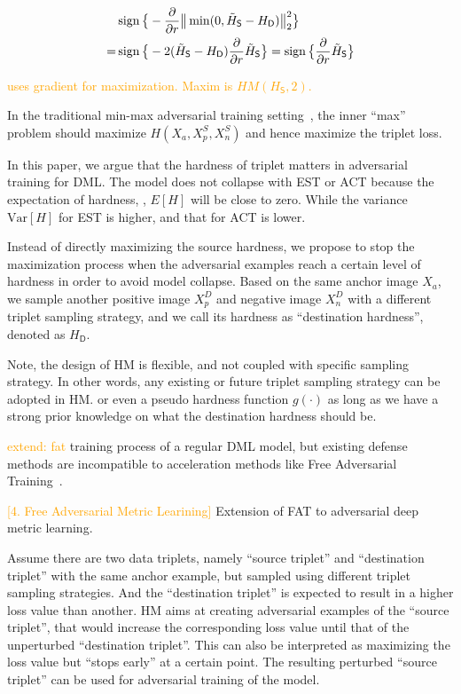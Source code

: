 \documentclass[10pt,twocolumn,letterpaper]{article}
\newcommand{\oo}[1]{\textcolor{orange}{#1}}
\begin{document}
\begin{align}
	&
	\operatorname{sign}\big\{
		-\frac{\partial}{\partial r} \big\| \min(0, 
		\tilde{H}_\mathsf{S} - H_\mathsf{D}) \big\|_2^2
	\big\}
	\\
	=&
	\operatorname{sign}\big\{
		-2(\tilde{H}_\mathsf{S}-H_\mathsf{D})
		\frac{\partial }{\partial r} \tilde{H}_\mathsf{S} \big\}
	=
	\operatorname{sign}\big\{
		\frac{\partial}{\partial r} \tilde{H}_\mathsf{S}
		\big\}
\end{align}

\oo{uses gradient for maximization. Maxim is $HM(H_\mathsf{S}, 2)$.}

In the traditional min-max adversarial training setting~\cite{madry}, the inner
``max'' problem should maximize $H(X_a,X_p^S,X_n^S)$ and hence maximize the triplet
loss.

In this paper, we argue that the hardness of triplet matters in adversarial
training for DML.
%
The model does not collapse with EST or ACT because the expectation of hardness,
\ie, $E[H]$ will be close to zero.
%
While the variance $\text{Var}[H]$ for EST is higher, and that for ACT is lower.

Instead of directly maximizing the source hardness, we propose to stop the
maximization process when the adversarial examples reach a certain level of
hardness in order to avoid model collapse.
%
Based on the same anchor image $X_a$, we sample another positive image $X_p^D$
and negative image $X_n^D$ with a different triplet sampling strategy, and
we call its hardness as ``destination hardness'', denoted as $H_\mathsf{D}$.

Note, the design of HM is flexible, and not coupled with specific sampling
strategy.
%
In other words, any existing or future triplet sampling strategy can
be adopted in HM.
%
or even a pseudo hardness function $g(\cdot)$ as long as we have a strong
prior knowledge on what the destination hardness should be.

\oo{extend: fat}
training process of a regular DML model, but existing defense methods are
incompatible to acceleration methods like Free Adversarial
Training~\cite{freeat}.

\oo{[4. Free Adversarial Metric Learining]}
Extension of FAT to adversarial deep metric learning.

%
Assume there are two data triplets, namely ``source triplet'' and ``destination
triplet'' with the same anchor example, but sampled using different triplet
sampling strategies.
%
And the ``destination triplet'' is expected to result in a higher loss value
than another.
%
HM aims at creating adversarial examples of the ``source triplet'', that would
increase the corresponding loss value until that of the unperturbed
``destination triplet''.
%
This can also be interpreted as maximizing the loss value but ``stops early''
at a certain point.
%
The resulting perturbed ``source triplet'' can be used for adversarial training
of the model.
\end{document}
